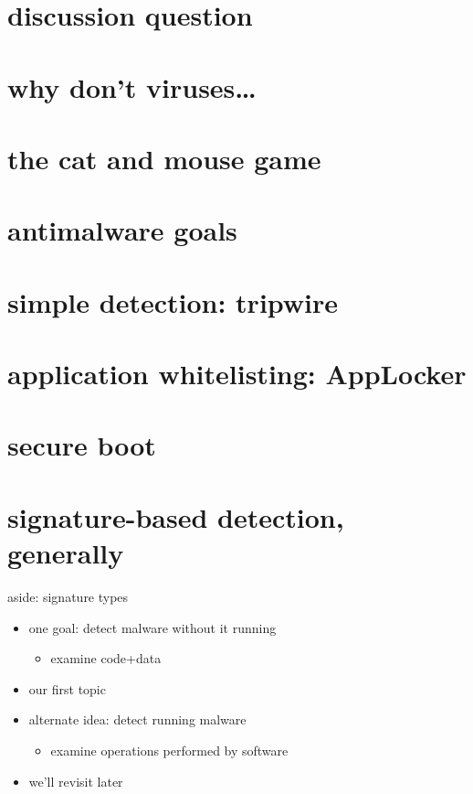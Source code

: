 \section{discussion question}


\section{why don't viruses\ldots}


\section{the cat and mouse game}


\section{antimalware goals}


\section{simple detection: tripwire} 


\section{application whitelisting: AppLocker}


\section{secure boot}


\section{signature-based detection, generally}


\begin{frame}{aside: signature types}
    \begin{itemize}
    \item one goal: detect malware without it running
        \begin{itemize}
        \item examine code+data
        \end{itemize}
    \item our first topic
    \vspace{.5cm}
    \item alternate idea: detect running malware
        \begin{itemize}
        \item examine operations performed by software
        \end{itemize}
    \item we'll revisit later
    \end{itemize}
\end{frame}


